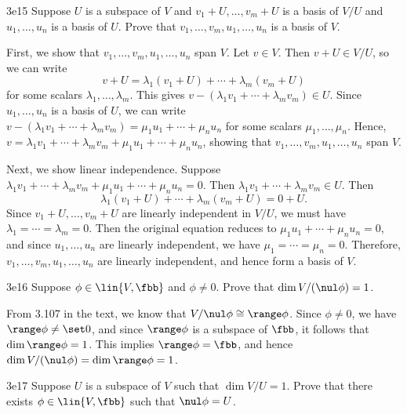 \begin{exercise}{3e15}
    Suppose $U$ is a subspace of $V$ and $v_1 + U, \ldots, v_m + U$ is a basis of $V / U$ and $u_1, \ldots, u_n$ is a basis of $U$.
	Prove that $v_1, \ldots, v_m, u_1, \ldots, u_n$ is a basis of $V$.
\end{exercise}

\begin{sol}
    First, we show that $v_1, \ldots, v_m, u_1, \ldots, u_n$ span $V$.
	Let $v \in V$.
	Then $v + U \in V / U$, so we can write
    \[
    	v + U = \lambda_1 (v_1 + U) + \cdots + \lambda_m (v_m + U)
    \]
    for some scalars $\lambda_1, \ldots, \lambda_m$.
	This gives $v - (\lambda_1 v_1 + \cdots + \lambda_m v_m) \in U$.
	Since $u_1, \ldots, u_n$ is a basis of $U$, we can write $v - (\lambda_1 v_1 + \cdots + \lambda_m v_m) = \mu_1 u_1 + \cdots + \mu_n u_n$ for some scalars $\mu_1, \ldots, \mu_n$.
	Hence, $v = \lambda_1 v_1 + \cdots + \lambda_m v_m + \mu_1 u_1 + \cdots + \mu_n u_n$, showing that $v_1, \ldots, v_m, u_1, \ldots, u_n$ span $V$.

    Next, we show linear independence.
	Suppose $\lambda_1 v_1 + \cdots + \lambda_m v_m + \mu_1 u_1 + \cdots + \mu_n u_n = 0$.
	Then $\lambda_1 v_1 + \cdots + \lambda_m v_m \in U$.
	Then
    \[
    	\lambda_1(v_1 + U) + \cdots + \lambda_m(v_m + U) = 0 + U.
    \]
    Since $v_1 + U, \ldots, v_m + U$ are linearly independent in $V / U$, we must have $\lambda_1 = \cdots = \lambda_m = 0$.
	Then the original equation reduces to $\mu_1 u_1 + \cdots + \mu_n u_n = 0$, and since $u_1, \ldots, u_n$ are linearly independent, we have $\mu_1 = \cdots = \mu_n = 0$.
	Therefore, $v_1, \ldots, v_m, u_1, \ldots, u_n$ are linearly independent, and hence form a basis of $V$.
\end{sol}

\begin{exercise}{3e16}
    Suppose $\phi \in \lin{V, \fbb}$ and $\phi \neq 0$.
	Prove that $\dim V / (\nul \phi) = 1$.
\end{exercise}

\begin{sol}
   From 3.107 in the text, we know that $V / \nul \phi \cong \range \phi$.
	Since $\phi \neq 0$, we have $\range \phi \neq \set 0$, and since $\range \phi$ is a subspace of $\fbb$, it follows that $\dim \range \phi = 1$.
	This implies $\range \phi = \fbb$, and hence $\dim V / (\nul \phi) = \dim \range \phi = 1$.
\end{sol}

\begin{exercise}{3e17}
    Suppose $U$ is a subspace of $V$ such that $\dim V / U = 1$.
	Prove that there exists $\phi \in \lin{V, \fbb}$ such that $\nul \phi = U$.
\end{exercise}

